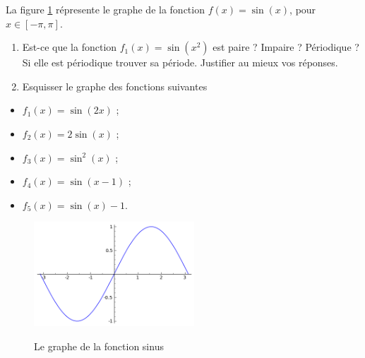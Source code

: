 \begin{exercice}\label{exoDS2012-1-0001}

La figure \ref{graphesin} r\'epresente le graphe de la fonction $f(x)=\sin(x)$, pour $x\in[-\pi,\pi]$. 

\begin{enumerate}
\item Est-ce que la fonction $f_1(x)=\sin(x^2)$ est paire ? Impaire ? P\'eriodique ? Si elle est p\'eriodique trouver sa p\'eriode. Justifier au mieux vos réponses.  
\item Esquisser le graphe des fonctions suivantes  
\end{enumerate}

 
\begin{multicols}{3}
  \begin{itemize}
    \renewcommand{\labelitemi}{$\bullet$}
  \item $f_1(x)=\sin(2x)$ ;
  \item $f_2(x)=2\sin(x)$ ;
  \item $f_3(x)=\sin^2(x)$ ;
  \item $f_4(x)=\sin(x-1)$ ;
  \item $f_5(x)=\sin(x)-1$.
  \end{itemize}
\end{multicols}

\begin{figure}
 \begin{center}
  \caption{Le graphe de la fonction sinus}
   \includegraphics[width=6cm]{sin.png}\label{graphesin}
\end{center}
\end{figure}


\end{exercice}
